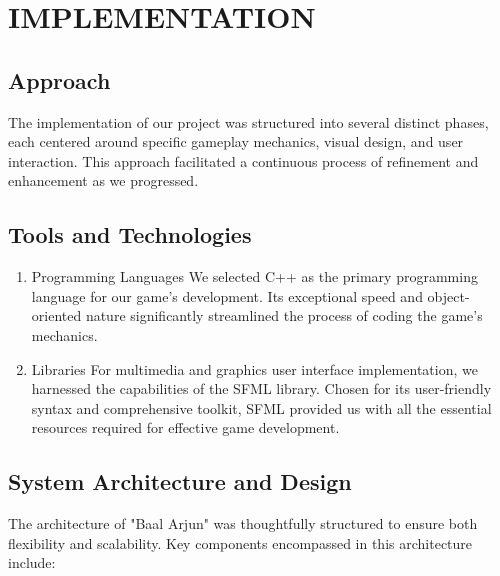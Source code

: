 \section{IMPLEMENTATION}


	 \subsection{Approach}
	
		The implementation of our project was structured into several distinct phases, each centered around specific gameplay mechanics, visual design, and user interaction. This approach facilitated a continuous process of refinement and enhancement as we progressed.
	
	 \subsection{Tools and Technologies}
		\begin{enumerate}
			\item Programming Languages
					We selected C++ as the primary programming language for our game's development. Its exceptional speed and object-oriented nature significantly streamlined the process of coding the game's mechanics.
			\item Libraries
					For multimedia and graphics user interface implementation, we harnessed the capabilities of the SFML library. Chosen for its user-friendly syntax and comprehensive toolkit, SFML provided us with all the essential resources required for effective game development.
			
		\end{enumerate}
	
	\subsection{System Architecture and Design}
	
		The architecture of "Baal Arjun" was thoughtfully structured to ensure both flexibility and scalability. Key components encompassed in this architecture include:
		

